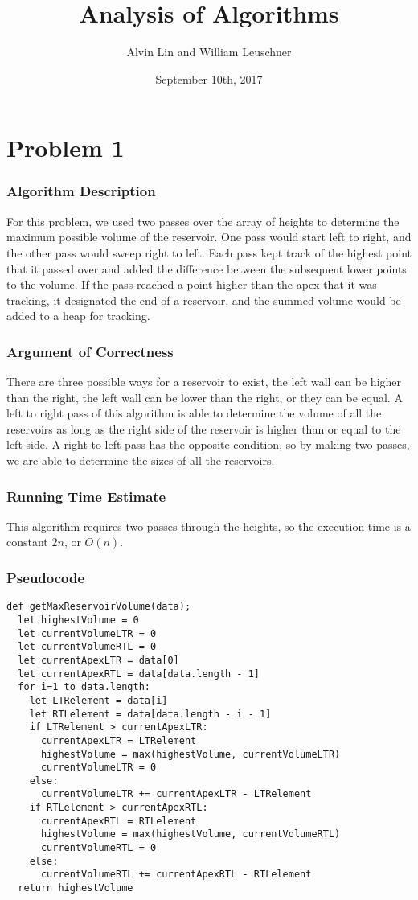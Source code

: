 \documentclass[letterpaper, 12pt]{math}
\title{Analysis of Algorithms}
\author{Alvin Lin and William Leuschner}
\date{September 10th, 2017}
\begin{document}
\maketitle

\section*{Problem 1}

\subsubsection*{Algorithm Description}
For this problem, we used two passes over the array of heights to determine
the maximum possible volume of the reservoir. One pass would start left to
right, and the other pass would sweep right to left. Each pass kept track of
the highest point that it passed over and added the difference between the
subsequent lower points to the volume. If the pass reached a point higher than
the apex that it was tracking, it designated the end of a reservoir, and the
summed volume would be added to a heap for tracking.

\subsubsection*{Argument of Correctness}
There are three possible ways for a reservoir to exist, the left wall can be
higher than the right, the left wall can be lower than the right, or they can
be equal. A left to right pass of this algorithm is able to determine the
volume of all the reservoirs as long as the right side of the reservoir is
higher than or equal to the left side. A right to left pass has the opposite
condition, so by making two passes, we are able to determine the sizes of all
the reservoirs.

\subsubsection*{Running Time Estimate}
This algorithm requires two passes through the heights, so the execution time is
a constant \( 2n \), or \( O(n) \).

\subsubsection*{Pseudocode}
\begin{lstlisting}
def getMaxReservoirVolume(data);
  let highestVolume = 0
  let currentVolumeLTR = 0
  let currentVolumeRTL = 0
  let currentApexLTR = data[0]
  let currentApexRTL = data[data.length - 1]
  for i=1 to data.length:
    let LTRelement = data[i]
    let RTLelement = data[data.length - i - 1]
    if LTRelement > currentApexLTR:
      currentApexLTR = LTRelement
      highestVolume = max(highestVolume, currentVolumeLTR)
      currentVolumeLTR = 0
    else:
      currentVolumeLTR += currentApexLTR - LTRelement
    if RTLelement > currentApexRTL:
      currentApexRTL = RTLelement
      highestVolume = max(highestVolume, currentVolumeRTL)
      currentVolumeRTL = 0
    else:
      currentVolumeRTL += currentApexRTL - RTLelement
  return highestVolume
\end{lstlisting}
\end{document}
